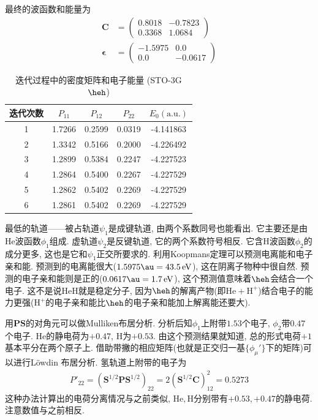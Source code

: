 最终的波函数和能量为
\begin{align}
	\mathbf{C} &= 
	\begin{pmatrix}
		0.8018&-0.7823\\0.3368&1.0684
	\end{pmatrix}\\
	\bm{\epsilon} &= 
	\begin{pmatrix}
		-1.5975&0.0\\0.0&-0.0617
	\end{pmatrix}
\end{align}
\begin{table}[H]
	\centering
	\caption{迭代过程中的密度矩阵和电子能量 (STO-3G $\heh$) }
	\begin{tabular}{ccccc}
		\hline
		迭代次数 & $P_{11}$ & $P_{12}$ & $P_{22}$ & $E_0(\mathrm{a.u.})$ \\ \hline
		1   &  1.7266  &  0.2599  &  0.0319  &      -4.141863       \\
		2   &  1.3342  &  0.5166  &  0.2000  &      -4.226492       \\
		3   &  1.2899  &  0.5384  &  0.2247  &      -4.227523       \\
		4   &  1.2864  &  0.5400  &  0.2267  &      -4.227529       \\
		5   &  1.2862  &  0.5402  &  0.2269  &      -4.227529       \\
		6   &  1.2861  &  0.5402  &  0.2269  &      -4.227529       \\ \hline
	\end{tabular}
	\label{t3.5}
\end{table}
最低的轨道——被占轨道$\psi_1$是成键轨道, 
由两个系数同号也能看出. 
它主要还是由$\mathrm{He}$波函数$\phi_1$组成. 
虚轨道$\psi_2$是反键轨道, 
它的两个系数符号相反. 
它含$\mathrm{H}$波函数$\phi_2$的成分更多, 
这也是它和$\psi_1$正交所要求的. 
利用Koopmans定理可以预测电离能和电子亲和能. 
预测到的电离能很大($1.5975\au=43.5 \,\mathrm{eV}$), 
这在阴离子物种中很自然. 
预测的电子亲和能则是正的($0.0617\au=1.7\,\mathrm{eV}$), 
这个预测值意味着$\heh$会结合一个电子. 
这不是说$\mathrm{HeH}$就是稳定分子, 
因为$\heh$的解离产物(即$\mathrm{He}+\mathrm{H}^+$)结合电子的能力更强($\mathrm{H}^+$的电子亲和能比$\heh$的电子亲和能加上解离能还要大).


用$\mathbf{PS}$的对角元可以做Mulliken布居分析. 
分析后知$\phi_1$上附带$1.53$个电子, 
$\phi_2$带$0.47$个电子.
$\mathrm{He}$的静电荷为$+0.47$, 
$\mathrm{H}$为$+0.53$. 
由这个预测结果就知道, 
总的形式电荷$+1$基本平分在两个原子上. 
借助带撇的相应矩阵(也就是正交归一基$\{\phi_\mu'\}$下的矩阵)可以进行L\"owdin 布居分析. 
氢轨道上附带的电子为
\begin{align}
	P'_{22} = (\mathbf{S}^{1/2}\mathbf{PS}^{1/2})_{22} = 2(\mathbf{S}^{1/2}\mathbf{C})^2_{12}=0.5273
\end{align}
这种办法计算出的电荷分离情况与之前类似, 
$\mathrm{He,H}$分别带有$+0.53,+0.47$的静电荷. 
注意数值与之前相反.


